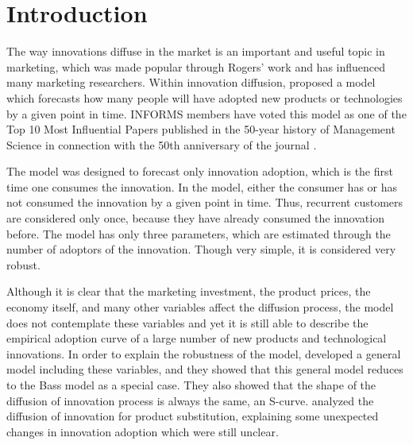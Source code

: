 
\chapter{Introduction}

The way innovations diffuse in the market is an important and useful topic in marketing, which was made popular through Rogers' work \citep{rogers1962diffusion} and has influenced many marketing researchers. Within innovation diffusion, \citet{bass1969} proposed a model which forecasts how many people will have adopted new products or technologies by a given point in time. INFORMS members have voted this model as one of the Top 10 Most Influential Papers published in the 50-year history of Management Science in connection with the 50th anniversary of the journal \citep{bass2004comments}.

The \citet{bass1969} model was designed to forecast only innovation adoption, which is the first time one consumes the innovation. In the model, either the consumer has or has not consumed the innovation by a given point in time. Thus, recurrent customers are considered only once, because they have already consumed the innovation before. The model has only three parameters, which are estimated through the number of adoptors of the innovation. Though very simple, it is considered very robust.

Although it is clear that the marketing investment, the product prices, the economy itself, and many other variables affect the diffusion process, the \citet{bass1969} model does not contemplate these variables and yet it is still able to describe the empirical adoption curve of a large number of new products and technological innovations. In order to explain the robustness of the model, \citet{bass1994bass} developed a general model including these variables, and they showed that this general model reduces to the Bass model as a special case. They also showed that the shape of the diffusion of innovation process is always the same, an S-curve. \citet{norton1987diffusion} analyzed the diffusion of innovation for product substitution, explaining some unexpected changes in innovation adoption which were still unclear.

